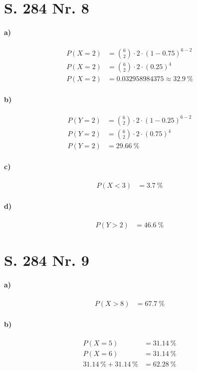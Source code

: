 \documentclass[12pt,a4paper]{report}
\begin{document}
	\section{S. 284 Nr. 8}
	\paragraph{a)}
	\begin{align*}
		P(X=2) &= \binom{6}{2} \cdot 2 \cdot (1-0.75)^{6-2} \\
		P(X=2) &= \binom{6}{2} \cdot 2 \cdot (0.25)^4 \\
		P(X=2) &= 0.032958984375 \approx 32.9\ \%
	\end{align*}
	\paragraph{b)}
	\begin{align*}
		P(Y=2) &= \binom{6}{2} \cdot 2 \cdot (1-0.25)^{6-2} \\
		P(Y=2) &= \binom{6}{2} \cdot 2 \cdot (0.75)^4 \\
		P(Y=2) &= 29.66\ \%
	\end{align*}
	\paragraph{c)}
	\begin{align*}
		P(X < 3) &= 3.7\ \%
	\end{align*}
	\paragraph{d)}
	\begin{align*}
		P(Y > 2) &= 46.6\ \%
	\end{align*}
	\section{S. 284 Nr. 9}
	\paragraph{a)}
	\begin{align*}
		P(X > 8) &= 67.7\ \%
	\end{align*}
	\paragraph{b)}
	\begin{align*}
		P(X = 5) &= 31.14\ \% \\
		P(X = 6) &= 31.14\ \% \\
		31.14\ \% + 31.14\ \% &= 62.28\ \%
	\end{align*}
\end{document}
